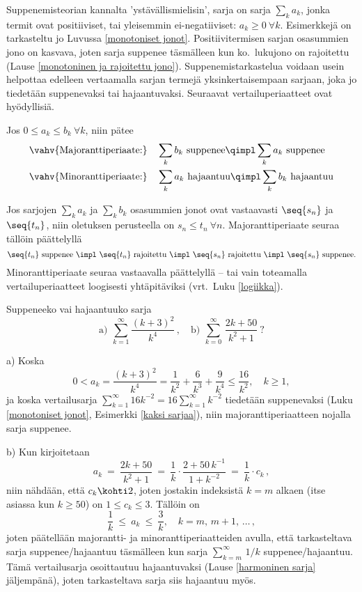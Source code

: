 Suppenemisteorian kannalta 'ystävällismielisin', sarja on 
sarja $\sum_ka_k$, jonka termit ovat positiiviset, tai yleisemmin ei-negatiiviset:
$a_k \ge 0\ \forall k$. Esimerkkejä on tarkasteltu jo Luvussa \ref{monotoniset jonot}.
Positiivitermisen sarjan osasummien jono on kasvava, joten sarja suppenee täsmälleen kun
ko.\ lukujono on rajoitettu (Lause \ref{monotoninen ja rajoitettu jono}).
Suppenemistarkastelua voidaan usein helpottaa edelleen vertaamalla sarjan termejä
yksinkertaisempaan sarjaan, joka jo tiedetään suppenevaksi tai hajaantuvaksi. Seuraavat
vertailuperiaatteet ovat hyödyllisiä.
\begin{Lause} \label{sarjojen vertailu} 
 
Jos $0 \le a_k \le b_k\ \forall k$, niin pätee
\begin{align*}
\text{\vahv{Majoranttiperiaate:}}\quad &\sum_k b_k\ \text{suppenee} 
                                     \qimpl \sum_k a_k\ \text{suppenee} \\
\text{\vahv{Minoranttiperiaate:}}\quad &\sum_k a_k\ \text{hajaantuu} 
                                     \qimpl \sum_k b_k\ \text{hajaantuu}
\end{align*}
\end{Lause}
\tod Jos sarjojen $\sum_ka_k$ ja $\sum_kb_k$ osasummien jonot ovat vastaavasti $\seq{s_n}$ ja
$\seq{t_n}$, niin oletuksen perusteella on $s_n \le t_n\ \forall n$. Majoranttiperiaate seuraa
tällöin päättelyllä
\[
\seq{t_n}\ \text{suppenee}\ \impl\ \seq{t_n}\ \text{rajoitettu}\ 
                            \impl\ \seq{s_n}\ \text{rajoitettu}\
                            \impl\ \seq{s_n}\ \text{suppenee}.
\]
Minoranttiperiaate seuraa vastaavalla päättelyllä -- tai vain toteamalla vertailuperiaatteet
loogisesti yhtäpitäviksi (vrt.\ Luku \ref{logiikka}). \loppu
\begin{Exa} Suppeneeko vai hajaantuuko sarja
\[
\text{a)}\,\ \sum_{k=1}^\infty \frac{(k+3)^2}{k^4}\,, \quad 
\text{b)}\,\ \sum_{k=0}^\infty\,\frac{2k+50}{k^2 + 1}\ ?
\] 
\end{Exa}
\ratk a) Koska
\[
0 < a_k = \frac{(k+3)^2}{k^4} 
        = \frac{1}{k^2}+\frac{6}{k^3}+\frac{9}{k^4} \le \frac{16}{k^2}, \quad k \ge 1,
\]
ja koska vertailusarja $\sum_{k=1}^\infty 16k^{-2}=16\sum_{k=1}^\infty k^{-2}$ tiedetään 
suppenevaksi (Luku \ref{monotoniset jonot}, Esimerkki \ref{kaksi sarjaa}), niin
majoranttiperiaatteen nojalla sarja suppenee.

b) Kun kirjoitetaan
\[
a_k\ =\ \dfrac{2k+50}{k^2 + 1}\ =\ \dfrac{1}{k} \cdot \dfrac{2 + 50\,k^{-1}}{1 + k^{-2}}\ 
                                =\ \dfrac{1}{k} \cdot c_k\,,
\]
niin nähdään, että $c_k \kohti 2$, joten jostakin indeksistä $k=m$ alkaen (itse asiassa kun 
$k \ge 50$) on $1 \le c_k \le 3$. Tällöin on
\[
\dfrac{1}{k}\ \le\ a_k\ \le\ \dfrac{3}{k}, \quad k=m,\,m+1,\,\ldots\,,
\]
joten päätellään majorantti- ja minoranttiperiaatteiden avulla, että tarkasteltava sarja 
suppenee/hajaantuu täsmälleen kun sarja $\sum_{k=m}^\infty\, 1/k$ suppenee/hajaantuu. Tämä 
vertailusarja osoittautuu hajaantuvaksi (Lause \ref{harmoninen sarja} jäljempänä), joten 
tarkasteltava sarja siis hajaantuu myös. \loppu


